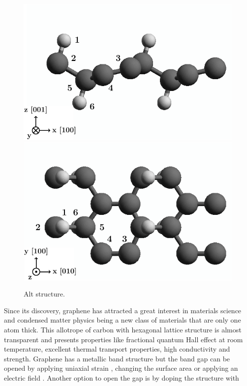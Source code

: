 \documentclass[prb,11pt,tightenlines,twocolumn,aps]{revtex4-1}
\begin{document}
\begin{figure}[ht!]
    \centering
    \includegraphics[width=\linewidth]{figures/altstruc2}
    \\
    \includegraphics[width=\linewidth]{figures/altstruc1}
    \caption{Alt structure.}
    \label{fig:alt-struc}
\end{figure}


Since its discovery, graphene has attracted a great interest in materials
science and condensed matter physics being a new class of materials that are
only one atom thick\cite{geimNM07}. This allotrope of carbon with hexagonal
lattice structure is almost transparent and presents properties like fractional
quantum Hall effect at room temperature, excellent thermal transport properties,
high conductivity and strength.\cite{geimNM07, reinaNL08, novoselov2S07,
balandinNL08} Graphene has a metallic band structure but the band gap can be
opened by applying uniaxial strain \cite{niACSN08}, changing the surface
area\cite{hanPRL07} or applying an electric field \cite{zhangN09}. Another option to open the gap is by doping the structure with 
\end{document}
